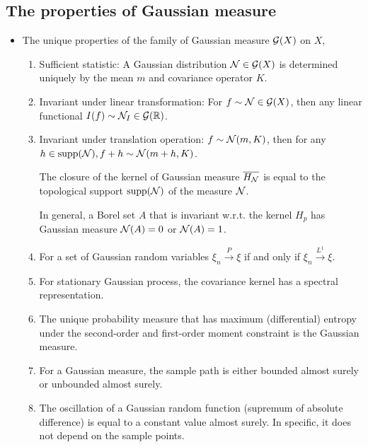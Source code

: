 \documentclass[11pt]{article}
\begin{document}
\subsection{The properties of Gaussian measure}
\begin{itemize}
\item The unique properties of the family of Gaussian measure ${\mathcal G}(X)$ on $X$, 
\begin{enumerate}
\item Sufficient statistic: A Gaussian distribution ${\mathcal N} \in {\mathcal G}(X)$ is determined uniquely by the mean $m$ and covariance operator $K$.

\item Invariant under linear transformation: For $f \sim {\mathcal N} \in {\mathcal G}(X)$, then any linear functional $I(f)\sim {\mathcal N}_{I} \in {\mathcal G}({\mathbb R})$. 

\item Invariant under translation operation:  $f\sim {\mathcal N}(m, K)$, then for any $h\in \text{supp}({\mathcal N}), f+h \sim {\mathcal N}(m+h, K)$.

The closure of the kernel of Gaussian measure $\overline{H_{{\mathcal N}}}$ is equal to the topological support $\text{supp}({\mathcal N})$ of the measure ${\mathcal N}$.  

In general, a Borel set $A$ that is invariant w.r.t. the kernel $H_{p}$ has Gaussian measure ${\mathcal N}(A)= 0$ or ${\mathcal N}(A)=1$.

\item For a set of Gaussian random variables $\xi_{n} \stackrel{P}{\rightarrow} \xi$ if and only if $\xi_{n} \stackrel{L^{1}}{\rightarrow} \xi$.

\item For stationary Gaussian process, the covariance kernel has a spectral representation.

\item The unique probability measure that has maximum (differential) entropy under the second-order and first-order moment constraint is the Gaussian measure. 

\item For a Gaussian measure, the sample path is either bounded almost surely or unbounded almost surely.

\item The oscillation of a Gaussian random function (supremum of absolute difference) is equal to a constant value almost surely. In specific, it does not depend on the sample points. 
\end{enumerate}
\end{itemize}
  
\end{document}
